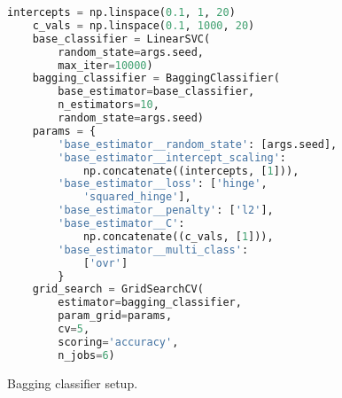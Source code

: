 \documentclass[12pt,a4paper]{report}
\let\openright=\clearpage
\begin{document}
\begin{figure}[ht]
\caption{Bagging classifier setup.}
\begin{lstlisting}[language=Python,frame=single]
    intercepts = np.linspace(0.1, 1, 20)
    c_vals = np.linspace(0.1, 1000, 20)
    base_classifier = LinearSVC(
        random_state=args.seed, 
        max_iter=10000)
    bagging_classifier = BaggingClassifier(
        base_estimator=base_classifier, 
        n_estimators=10, 
        random_state=args.seed)
    params = {
        'base_estimator__random_state': [args.seed],
        'base_estimator__intercept_scaling': 
            np.concatenate((intercepts, [1])),
        'base_estimator__loss': ['hinge',
            'squared_hinge'],
        'base_estimator__penalty': ['l2'],
        'base_estimator__C': 
            np.concatenate((c_vals, [1])),
        'base_estimator__multi_class': 
            ['ovr']
        }
    grid_search = GridSearchCV(
        estimator=bagging_classifier, 
        param_grid=params, 
        cv=5,
        scoring='accuracy',
        n_jobs=6)
\end{lstlisting}
\label{fig:bagging_classifier}
\end{figure}

\openright
\end{document}
